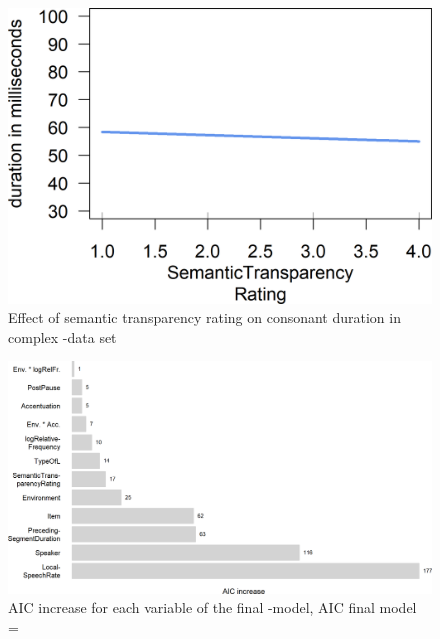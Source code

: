  

 
\begin{figure}
	 
	\includegraphics [scale=0.5] {images/Experiment/LyModelRating}
	\caption{Effect of semantic transparency rating on consonant duration in complex -data set}
	\label{fig: Rating  lyComplex experiment}

\end{figure}





\begin{figure}
	
		
	\includegraphics[scale=0.7]{images/Experiment/AICdecreaseLYComplex.png}
	\caption{AIC increase for each variable of the final -model, AIC final model = }
	\label{fig:Effect sozed ly compl Exp}

\end{figure}


